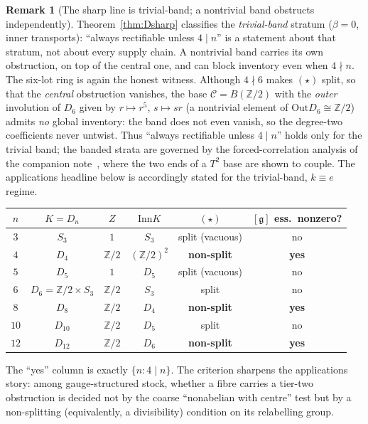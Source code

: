 \documentclass[11pt]{article}
\theoremstyle{definition}
\newtheorem{remark}[theorem]{Remark}
\newcommand{\C}{\mathcal{C}}
\newcommand{\Z}{\mathbb{Z}}
\newcommand{\Inn}{\mathrm{Inn}}
\newcommand{\Out}{\mathrm{Out}}
\newcommand{\Zc}{Z}
\newcommand{\gerbe}{\mathfrak{g}}
\begin{document}
\begin{remark}[The sharp line is trivial-band; a nontrivial band obstructs independently]\label{rem:d6band}
Theorem~\ref{thm:Dsharp} classifies the \emph{trivial-band} stratum ($\beta=0$, inner transports):
``always rectifiable unless $4\mid n$'' is a statement about that stratum, not about every supply
chain. A nontrivial band carries its own obstruction, on top of the central one, and can block
inventory even when $4\nmid n$. The six-lot ring is again the honest witness. Although $4\nmid6$
makes $(\star)$ split, so that the \emph{central} obstruction vanishes, the base $\C=B(\Z/2)$ with
the \emph{outer} involution of $D_6$ given by $r\mapsto r^5$, $s\mapsto sr$ (a nontrivial element of
$\Out D_6\cong\Z/2$) admits \emph{no} global inventory: the band does not even vanish, so the
degree-two coefficients never untwist. Thus ``always rectifiable unless $4\mid n$'' holds only for
the trivial band; the banded strata are governed by the forced-correlation analysis of the companion
note~\cite{gerbetorus}, where the two ends of a $T^2$ base are shown to couple. The applications
headline below is accordingly stated for the trivial-band, $k\equiv e$ regime.
\end{remark}

\begin{center}
\begin{tabular}{cccccc}
\toprule
$n$ & $K=D_n$ & $\Zc$ & $\Inn K$ & $(\star)$ & $[\gerbe]$ ess.\ nonzero?\\
\midrule
$3$  & $S_3$                 & $1$    & $S_3$        & split (vacuous)     & no\\
$4$  & $D_4$                 & $\Z/2$ & $(\Z/2)^2$   & \textbf{non-split}  & \textbf{yes}\\
$5$  & $D_5$                 & $1$    & $D_5$        & split (vacuous)     & no\\
$6$  & $D_6=\Z/2\times S_3$  & $\Z/2$ & $S_3$        & split               & no\\
$8$  & $D_8$                 & $\Z/2$ & $D_4$        & \textbf{non-split}  & \textbf{yes}\\
$10$ & $D_{10}$              & $\Z/2$ & $D_5$        & split               & no\\
$12$ & $D_{12}$              & $\Z/2$ & $D_6$        & \textbf{non-split}  & \textbf{yes}\\
\bottomrule
\end{tabular}
\end{center}

\noindent The ``yes'' column is exactly $\{n:4\mid n\}$. The criterion sharpens the applications
story: among gauge-structured stock, whether a fibre carries a tier-two obstruction is decided not
by the coarse ``nonabelian with centre'' test but by a non-splitting (equivalently, a divisibility)
condition on its relabelling group.
\end{document}
